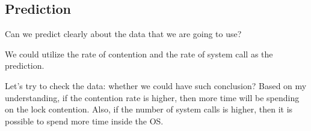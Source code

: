 \subsection{Prediction}
Can we predict clearly about the data that we are going to use? 

We could utilize the rate of contention and the rate of system call as the prediction.

Let's try to check the data: whether we could have such conclusion? Based on my understanding, if the contention rate is higher, then more time will be spending on the lock contention. Also, if the number of system calls is higher, then it is possible to spend more time inside the OS. 